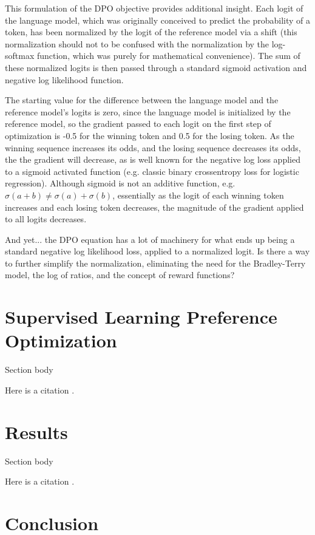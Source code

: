 \documentclass[twoside,11pt]{article}
\begin{document}
This formulation of the DPO objective provides additional insight. 
Each logit of the language model, which was originally conceived to predict the probability of a token,
has been normalized by the logit of the reference model via a shift (this normalization
should not to be confused with the normalization
by the log-softmax function, which was purely for mathematical convenience). The 
sum of these normalized logits is then passed through a standard sigmoid activation and 
negative log likelihood function.

The starting value for the difference between the language model 
and the reference model's logits is zero, since the language model is initialized
by the reference model, so the gradient passed to each logit on the first step of 
optimization is -0.5 for the winning token and 0.5 for the losing token. As the 
winning sequence increases its odds, and the losing sequence decreases its odds,
the the gradient will decrease, as is well known for the negative log loss applied
to a sigmoid activated function (e.g. classic binary crossentropy loss for
logistic regression). Although sigmoid is not an additive function, 
e.g. $\sigma(a + b) \neq \sigma(a) + \sigma(b)$, essentially as the logit of
each winning token increases and each losing token decreases, the magnitude of the
gradient applied to all logits decreases.

And yet... the DPO equation has a lot of machinery for what ends up being
a standard negative log likelihood loss, applied to a normalized logit.
Is there a way to further simplify
the normalization, eliminating the need for the Bradley-Terry model, the 
log of ratios, and the concept of reward functions? 

\section{Supervised Learning Preference Optimization}

Section body

Here is a citation \cite{chow:68}.

\section{Results}

Section body

Here is a citation \cite{chow:68}.

\section{Conclusion}
\end{document}
